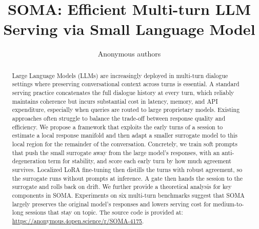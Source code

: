 \documentclass{article} %
\title{SOMA: Efficient Multi-turn LLM Serving via Small Language Model}
\author{Anonymous authors}
\theoremstyle{plain}
\theoremstyle{definition}
\theoremstyle{remark}
\theoremstyle{problem}
\begin{document}
\maketitle

\begin{abstract}
Large Language Models (LLMs) are increasingly deployed in multi-turn dialogue settings where preserving conversational context across turns is essential. A standard serving practice concatenates the full dialogue history at every turn, which reliably maintains coherence but incurs substantial cost in latency, memory, and API expenditure, especially when queries are routed to large proprietary models. Existing approaches often struggle to balance the trade-off between response quality and efficiency. We propose a framework that exploits the early turns of a session to estimate a local response manifold and then adapt a smaller surrogate model to this local region for the remainder of the conversation. Concretely, we train soft prompts that push the small surrogate away from the large model's responses, with an anti-degeneration term for stability, and score each early turn by how much agreement survives. Localized LoRA fine-tuning then distills the turns with robust agreement, so the surrogate runs without prompts at inference. A gate then hands the session to the surrogate and rolls back on drift. We further provide a theoretical analysis for key components in SOMA. Experiments on six multi-turn benchmarks suggest that SOMA largely preserves the original model's responses and lowers serving cost for medium-to-long sessions that stay on topic. The source code is provided at:
\url{https://anonymous.4open.science/r/SOMA-4175}.
\end{abstract}










{\setlength{\emergencystretch}{2em}%
}


\appendix
\newpage

\end{document}
